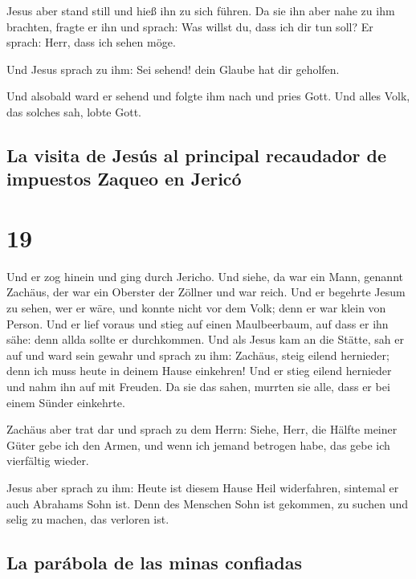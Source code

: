  Jesus aber stand still und hieß ihn zu sich führen. Da
sie ihn aber nahe zu ihm brachten, fragte er ihn  und
sprach: Was willst du, dass ich dir tun soll? Er sprach: Herr, dass ich
sehen möge.

 Und Jesus sprach zu ihm: Sei sehend! dein Glaube hat dir
geholfen.

 Und alsobald ward er sehend und folgte ihm nach und
pries Gott. Und alles Volk, das solches sah, lobte Gott.

\hypertarget{la-visita-de-jesuxfas-al-principal-recaudador-de-impuestos-zaqueo-en-jericuxf3}{%
\subsection{La visita de Jesús al principal recaudador de impuestos
Zaqueo en
Jericó}\label{la-visita-de-jesuxfas-al-principal-recaudador-de-impuestos-zaqueo-en-jericuxf3}}

\hypertarget{section-18}{%
\section{19}\label{section-18}}

 Und er zog hinein und ging durch Jericho. 
Und siehe, da war ein Mann, genannt Zachäus, der war ein Oberster der
Zöllner und war reich.  Und er begehrte Jesum zu sehen,
wer er wäre, und konnte nicht vor dem Volk; denn er war klein von
Person.  Und er lief voraus und stieg auf einen
Maulbeerbaum, auf dass er ihn sähe: denn allda sollte er durchkommen.
 Und als Jesus kam an die Stätte, sah er auf und ward sein
gewahr und sprach zu ihm: Zachäus, steig eilend hernieder; denn ich muss
heute in deinem Hause einkehren!  Und er stieg eilend
hernieder und nahm ihn auf mit Freuden.  Da sie das sahen,
murrten sie alle, dass er bei einem Sünder einkehrte.

 Zachäus aber trat dar und sprach zu dem Herrn: Siehe,
Herr, die Hälfte meiner Güter gebe ich den Armen, und wenn ich jemand
betrogen habe, das gebe ich vierfältig wieder.

 Jesus aber sprach zu ihm: Heute ist diesem Hause Heil
widerfahren, sintemal er auch Abrahams Sohn ist.  Denn
des Menschen Sohn ist gekommen, zu suchen und selig zu machen, das
verloren ist.

\hypertarget{la-paruxe1bola-de-las-minas-confiadas}{%
\subsection{La parábola de las minas
confiadas}\label{la-paruxe1bola-de-las-minas-confiadas}}

